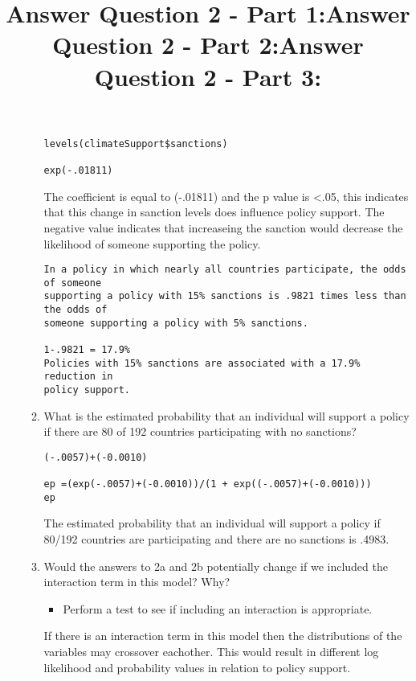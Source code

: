 \documentclass[12pt,letterpaper]{article}
\begin{document}
\begin{enumerate}
\begin{enumerate}
 \title{Answer Question 2 - Part 1:} 
 
\begin{verbatim}
levels(climateSupport$sanctions)
    
exp(-.01811)
\end{verbatim}

The coefficient is equal to (-.01811) and the p value is <.05, this indicates 
that this change in sanction levels does influence policy support. The negative value
indicates that increaseing the sanction
would decrease the likelihood of someone supporting the policy. 

\begin{verbatim}
In a policy in which nearly all countries participate, the odds of someone
supporting a policy with 15% sanctions is .9821 times less than the odds of 
someone supporting a policy with 5% sanctions. 
 
1-.9821 = 17.9%
Policies with 15% sanctions are associated with a 17.9% reduction in 
policy support. 

\end{verbatim}

		\item
		What is the estimated probability that an individual will support a policy if there are 80 of 192 countries participating with no sanctions? 
  
 \title{Answer Question 2 - Part 2:} 

\begin{verbatim}
(-.0057)+(-0.0010)

ep =(exp(-.0057)+(-0.0010))/(1 + exp((-.0057)+(-0.0010)))
ep

\end{verbatim}

The estimated probability that an individual will support a policy
if 80/192 countries are participating and there are no sanctions is .4983.


		\item
		Would the answers to 2a and 2b potentially change if we included the interaction term in this model? Why? 
		\begin{itemize}
			\item Perform a test to see if including an interaction is appropriate.\end{itemize}

  
\title{Answer Question 2 - Part 3:} 

If there is an interaction term in this model then the distributions of the 
variables may crossover eachother. This would result in different log likelihood 
and probability values in relation to policy support.


\end{enumerate}
\end{enumerate}
\end{document}
